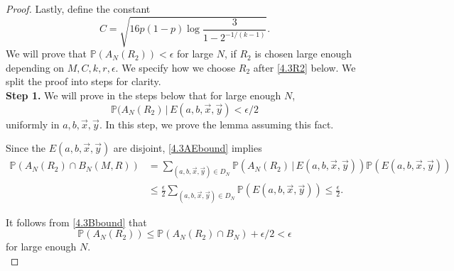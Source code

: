 \begin{proof}
		Lastly, define the constant
		\begin{equation}\label{4.3Cdef}
		C = \sqrt{16p(1-p)\log\frac{3}{1-2^{-1/(k-1)}}}.
		\end{equation}
		We will prove that $\mathbb{P}(A_N(R_2)) < \epsilon$ for large $N$, if $R_2$ is chosen large enough depending on $M,C,k,r,\epsilon$. We specify how we choose $R_2$ after \eqref{4.3R2} below. We split the proof into steps for clarity.\\
		
		\noindent\textbf{Step 1.} We will prove in the steps below that for large enough $N$,
		\begin{equation}\label{4.3AEbound}
		\mathbb{P}(A_N(R_2)\,|\,E(a,b,\vec{x},\vec{y}) < \epsilon/2
		\end{equation}
		uniformly in $a,b,\vec{x},\vec{y}$. In this step, we prove the lemma assuming this fact.
		
		Since the $E(a,b,\vec{x},\vec{y})$ are disjoint, \eqref{4.3AEbound} implies
		\begin{align*}
		\mathbb{P}(A_N(R_2) \cap B_N(M,R)) &= \sum_{(a,b,\vec{x},\vec{y})\in D_N} \mathbb{P}(A_N(R_2)\,|\,E(a,b,\vec{x},\vec{y}))\mathbb{P}(E(a,b,\vec{x},\vec{y}))\\
		&\leq \frac{\epsilon}{2}\sum_{(a,b,\vec{x},\vec{y})\in D_N} \mathbb{P}(E(a,b,\vec{x},\vec{y})) \leq \frac{\epsilon}{2}.
		\end{align*}
		
		It follows from \eqref{4.3Bbound} that
		\begin{equation*}
		\mathbb{P}(A_N(R_2)) \leq \mathbb{P}(A_N(R_2)\cap B_N) + \epsilon/2 < \epsilon
		\end{equation*}
		for large enough $N$.\\
		

\end{proof}
